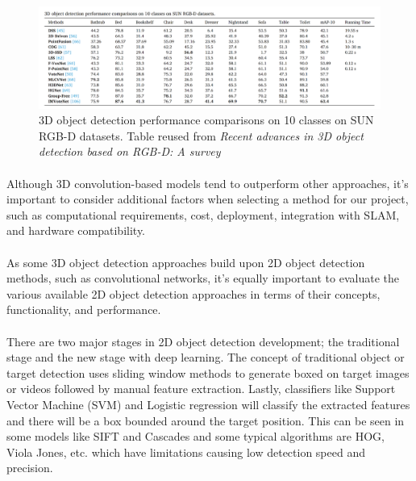 \begin{figure}
    \centering
    \includegraphics[width=0.8\linewidth]{assets/images/literature_survey/table_1.png}
    \caption{3D object detection performance comparisons on 10 classes on SUN RGB-D datasets. Table reused from \textit{Recent advances in 3D object detection based on RGB-D: A survey}\cite{wang2021recent}}
    \label{fig:3D object detection performance comparisons on 10 classes on SUN RGB-D datasets.} 
\end{figure}


\paragraph*{}
Although 3D convolution-based models tend to outperform other approaches, it's important to consider additional factors when selecting a method for our project, such as computational requirements, cost, deployment, integration with SLAM, and hardware compatibility.

\paragraph*{}
As some 3D object detection approaches build upon 2D object detection methods, such as convolutional networks, it’s equally important to evaluate the various available 2D object detection approaches in terms of their concepts, functionality, and performance.

\paragraph*{}
There are two major stages in 2D object detection development; the traditional stage and the new stage with deep learning. The concept of traditional object or target detection uses sliding window methods to generate boxed on target images or videos followed by manual feature extraction. Lastly, classifiers like Support Vector Machine (SVM)  and Logistic regression will classify the extracted features and there will be a box bounded around the target position. This can be seen in some models like SIFT and Cascades and some typical algorithms are HOG\cite{dalal2005histograms}, Viola Jones\cite{viola2001robust}, etc. which have limitations causing low detection speed and precision.

